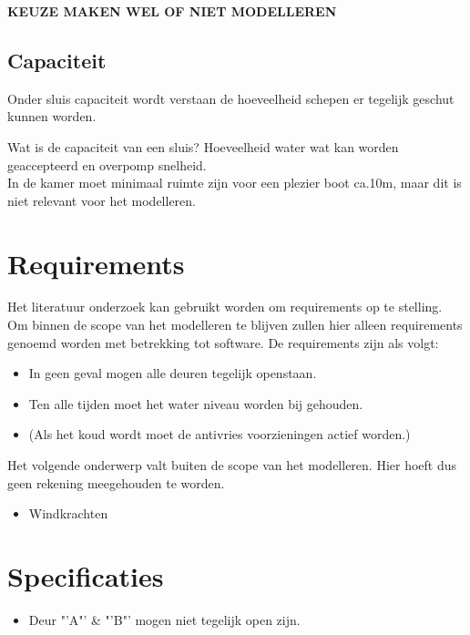 \documentclass{article}
\begin{document}
\vskip0.5cm

{\large \textbf{KEUZE MAKEN WEL OF NIET MODELLEREN}}

\subsection{Capaciteit}
Onder sluis capaciteit wordt verstaan de hoeveelheid schepen er tegelijk geschut kunnen worden.

Wat is de capaciteit van een sluis? Hoeveelheid water wat kan worden geaccepteerd en overpomp snelheid.\\
In de kamer moet minimaal ruimte zijn voor een plezier boot ca.10m, maar dit is niet relevant voor het modelleren.

\clearpage

\section{Requirements} %
Het literatuur onderzoek kan gebruikt worden om requirements op te stelling. Om binnen de scope van het modelleren te blijven zullen hier alleen requirements genoemd worden met betrekking tot software. De requirements zijn als volgt:
\begin{itemize}
\item In geen geval mogen alle deuren tegelijk openstaan.
\item Ten alle tijden moet het water niveau worden bij gehouden.
\item (Als het koud wordt moet de antivries voorzieningen actief worden.)

\end{itemize}

Het volgende onderwerp valt buiten de scope van het modelleren. Hier hoeft dus geen rekening meegehouden te worden.
\begin{itemize}
\item Windkrachten
\end{itemize}

\section{Specificaties} %

\begin{itemize}
\item Deur "'A"' \& "'B"' mogen niet tegelijk open zijn.

\end{itemize}
\end{document}
